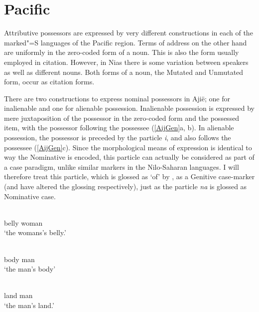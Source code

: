 \section{Pacific}\label{ExtraPac}

Attributive possessors are expressed by very different constructions in each of the marked"=S languages of the Pacific region.
Terms of address on the other hand are uniformly in the zero-coded form of a noun.
This is also the form usually employed in citation. 
However, in Nias there is some variation between speakers as well as different nouns.
Both forms of a noun, the Mutated and Unmutated form, occur as citation forms.
 


There are two constructions to express nominal possessors in Aji\"e; one for inalienable and one for alienable possession.
Inalienable possession is expressed by mere juxtaposition of the possessor in the zero-coded form and the possessed item, with the possessor following the possessee (\ref{AijGen}a, b). In alienable possession, the possessor is preceded by the particle \emph{i}, and also follows the possessee (\ref{AijGen}c).
Since the morphological means of expression is identical to way the Nominative is encoded, this particle can actually be considered as part of a case paradigm, unlike similar markers in the Nilo-Saharan languages. 
I will therefore treat this particle, which is glossed as `of' by \citet{Lichtenberk:1978}, as a Genitive case-marker (and have altered the glossing respectively), just as the particle \emph{na} is glossed as Nominative case. 

\begin{exe}\ex\label{AijGen}
\begin{xlist}
\ex\gll{} \textbf{}\\
belly woman\\
\glt `the womans's belly.' %

\ex\gll{} \textbf{}\\
body man\\
\glt `the man's body' %

\ex\gll{} \textbf{} \\
land \gen{} man\\
\glt `the man's land.' %
\end{xlist}
\end{exe}

